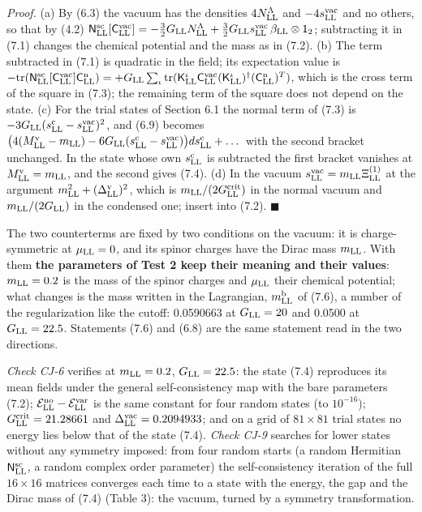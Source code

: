 \documentclass[
  10pt,
]{article}
\begin{document}
\emph{Proof.} (a) By (6.3) the vacuum has the densities
\(4N^\Lambda_{\rm LL}\) and \(-4s^{\rm vac}_{\rm LL}\) and no others, so
that by (4.2)
\(\mathsf N^{\rm sc}_{\rm LL}[\mathsf C^{\rm vac}_{\rm LL}]=-\tfrac32G_{\rm LL}N^\Lambda_{\rm LL}+\tfrac32G_{\rm LL}s^{\rm vac}_{\rm LL}\,\beta_{\rm LL}\otimes\mathsf 1_2\);
subtracting it in (7.1) changes the chemical potential and the mass as
in (7.2). (b) The term subtracted in (7.1) is quadratic in the field;
its expectation value is
\(-\mathrm{tr}(\mathsf N^{\rm sc}_{\rm LL}[\mathsf C^{\rm vac}_{\rm LL}]\mathsf C^{\rm n}_{\rm LL}) =+G_{\rm LL}\sum_\iota\mathrm{tr}(\mathsf K^\iota_{\rm LL}\mathsf C^{\rm vac}_{\rm LL}(\mathsf K^\iota_{\rm LL})^\dagger(\mathsf C^{\rm n}_{\rm LL})^T)\),
which is the cross term of the square in (7.3); the remaining term of
the square does not depend on the state. (c) For the trial states of
Section 6.1 the normal term of (7.3) is
\(-3G_{\rm LL}(s^{\rm c}_{\rm LL}-s^{\rm vac}_{\rm LL})^2\), and (6.9)
becomes
\(\big(4(M^{\rm v}_{\rm LL}-m_{\rm LL})-6G_{\rm LL}(s^{\rm c}_{\rm LL}-s^{\rm vac}_{\rm LL})\big)ds^{\rm c}_{\rm LL}+\dots\)
with the second bracket unchanged. In the state whose own
\(s^{\rm c}_{\rm LL}\) is subtracted the first bracket vanishes at
\(M^{\rm v}_{\rm LL}=m_{\rm LL}\), and the second gives (7.4). (d) In
the vacuum \(s^{\rm vac}_{\rm LL}=m_{\rm LL}\Xi^{(1)}_{\rm LL}\) at the
argument \(m_{\rm LL}^2+(\Delta^{\rm v}_{\rm LL})^2\), which is
\(m_{\rm LL}/(2G^{\rm crit}_{\rm LL})\) in the normal vacuum and
\(m_{\rm LL}/(2G_{\rm LL})\) in the condensed one; insert into (7.2).
\(\blacksquare\)

The two counterterms are fixed by two conditions on the vacuum: it is
charge-symmetric at \(\mu_{\rm LL}=0\), and its spinor charges have the
Dirac mass \(m_{\rm LL}\). With them \textbf{the parameters of Test 2
keep their meaning and their values}: \(m_{\rm LL}=0.2\) is the mass of
the spinor charges and \(\mu_{\rm LL}\) their chemical potential; what
changes is the mass written in the Lagrangian, \(m^{\rm b}_{\rm LL}\) of
(7.6), a number of the regularization like the cutoff: 0.0590663 at
\(G_{\rm LL}=20\) and 0.0500 at \(G_{\rm LL}=22.5\). Statements (7.6)
and (6.8) are the same statement read in the two directions.

\emph{Check CJ-6} verifies at \(m_{\rm LL}=0.2\), \(G_{\rm LL}=22.5\):
the state (7.4) reproduces its mean fields under the general
self-consistency map with the bare parameters (7.2);
\(\mathcal E^{\rm no}_{\rm LL}-\mathcal E^{\rm var}_{\rm LL}\) is the
same constant for four random states (to \(10^{-16}\));
\(G^{\rm crit}_{\rm LL}=21.28661\) and
\(\Delta^{\rm vac}_{\rm LL}=0.2094933\); and on a grid of \(81\times81\)
trial states no energy lies below that of the state (7.4). \emph{Check
CJ-9} searches for lower states without any symmetry imposed: from four
random starts (a random Hermitian \(\mathsf N^{\rm sc}_{\rm LL}\), a
random complex order parameter) the self-consistency iteration of the
full \(16\times16\) matrices converges each time to a state with the
energy, the gap and the Dirac mass of (7.4) (Table 3): the vacuum,
turned by a symmetry transformation.
\end{document}
